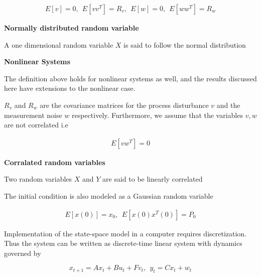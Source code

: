 \begin{eqnarray}
E[v] = 0, ~~ E[vv^T] = R_v, ~~ E[w] = 0, ~~ E[ww^T] = R_w 
\label{noise_proccess_1} 
\end{eqnarray}



\begin{framed}
\theoremstyle{remark}
\begin{remark}{\textbf{Normally distributed random variable}}

A one dimensional random variable $X$ is said to follow the normal distribution
\end{remark}
\end{framed}


\begin{framed}
\theoremstyle{remark}
\begin{remark}{\textbf{Nonlinear Systems}}

The definition above holds for nonlinear systems as well, and the results discussed here have extensions to the nonlinear case.
\end{remark}
\end{framed}

$R_v$ and $R_w$ are the covariance matrices for the process disturbance $v$ and the measurement noise $w$ respectively. Furthermore, we assume that the variables $v, w$ are not correlated i.e 

\begin{eqnarray}
E[vw^T] = 0
\label{noise_proccess_2} 
\end{eqnarray}


\begin{framed}
\theoremstyle{remark}
\begin{remark}{\textbf{Corralated random variables}}

Two random variables $X$ and $Y$ are said to be linearly correlated 
\end{remark}
\end{framed}

The initial condition is also modeled as a Gaussian random variable

\begin{eqnarray}
E[x(0)] = x_0, ~~ E[x(0)x^{T}(0)] = P_0
\label{noise_proccess_3} 
\end{eqnarray}

Implementation of the state-space model in a computer requires discretization. Thus the system can be written as discrete-time linear system with dynamics governed by

\begin{equation}
x_{t+1} = Ax_t + Bu_t + Fv_t,  ~~ y_t = Cx_t + w_t 
\end{equation}

